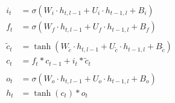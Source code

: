 \documentclass{article}
\begin{document}
\begin{align*}
    i_t &= \sigma(W_i \cdot h_{t,l-1} + U_i \cdot h_{t-1,l} + B_i) \\
    f_t &= \sigma(W_f \cdot h_{t,l-1} + U_f \cdot h_{t-1,l} + B_f) \\
    & \\
    \tilde{c}_t &= \tanh(W_{\tilde{c}} \cdot h_{t,l-1} + U_{\tilde{c}} \cdot h_{t-1,l} + B_{\tilde{c}}) \\
    c_t &= f_t * c_{t-1} + i_t * \tilde{c}_t \\
    & \\
    o_t &= \sigma(W_o \cdot h_{t,l-1} + U_o \cdot h_{t-1,l} + B_o) \\
    h_t &= \tanh(c_t) * o_t
\end{align*}
\end{document}
